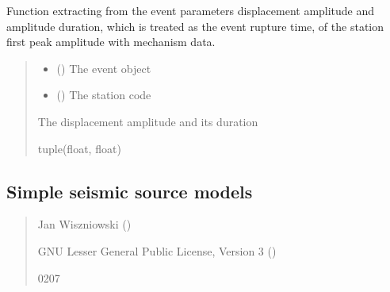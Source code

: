 \documentclass[letterpaper,10pt,english]{sphinxmanual}
\begin{document}
\begin{fulllineitems}
\label{\detokenize{api_lib:utils.extract_amplitude_delta}}
\pysigstartsignatures
{}
\pysigstopsignatures
\sphinxAtStartPar
Function extracting from the event parameters
displacement amplitude and amplitude duration,
which is treated as the event rupture time,
of the station first peak amplitude with mechanism data.
\begin{quote}\begin{description}
\begin{itemize}
\item {} 
\sphinxAtStartPar
{} () \textendash{} The event object

\item {} 
\sphinxAtStartPar
{} (\sphinxstyleliteralemphasis{\sphinxupquote{(}}\sphinxstyleliteralemphasis{\sphinxupquote{)}}) \textendash{} The station code

\end{itemize}

\sphinxAtStartPar
The displacement amplitude and its duration

\sphinxAtStartPar
tuple(float, float)

\end{description}\end{quote}

\end{fulllineitems}


\subsection{Simple seismic source models}
\label{\detokenize{api_lib:simple-seismic-source-models}}\label{\detokenize{api_lib:module-source_models}}\begin{quote}\begin{description}
\sphinxAtStartPar
Jan Wiszniowski ()

\sphinxAtStartPar
GNU Lesser General Public License, Version 3
()

\sphinxhyphen{}02\sphinxhyphen{}07

\end{description}\end{quote}
\end{document}
